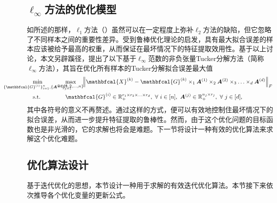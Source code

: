 \subsection{$\ell_{\infty}$方法的优化模型}\label{sec:linf}
如所述的那样，$\ell_{1}$方法（）虽然可以在一定程度上弥补$\ell_{2}$方法的缺陷，但它忽略了不同样本之间的重要性差异。受到鲁棒优化理论的启发，具有最大拟合误差的样本应该被给予最高的权重，从而保证在最坏情况下的特征提取效用性。基于以上讨论，本文另辟蹊径，提出了以下基于$\ell_\infty$范数的非负张量Tucker分解方法（简称$\ell_\infty$方法），其旨在优化所有样本的Tucker分解拟合误差最大值
\begin{equation}\label{eq:Linf}
\hspace{1em}
\begin{aligned}
    &\underset{\mathclap{\{\mathbfcal{G}^{(i)}\}_{i=1}^{n}, \{\boldsymbol{A}^{(j)}\}_{j=1}^{d}}}{\min} \qquad\quad &&\underset{\mathclap{k\in\{1,2,\ldots,n\}}}{\max}\quad \left\|\mathbfcal{X}^{(k)}-\mathbfcal{G}^{(k)} \times_{1} \boldsymbol{A}^{(1)} \times_{2} \boldsymbol{A}^{(2)}\times_{3} \ldots \times_{d} \boldsymbol{A}^{(d)}\right\|_{F}  \\
    &\text{s.t.} && \mathbfcal{G}^{(i)}\in\mathbb{R}_{+}^{r_1 \times r_2 \times \ldots \times r_d},~\forall~i\in[n] ,~\boldsymbol{A}^{(j)}\in \mathbb{R}_{+}^{n_j \times r_j},~\forall~j\in[d],
\end{aligned}
\end{equation}
其中各符号的意义不再赘述。通过这样的方式，便可以有效地控制住最坏情况下的拟合误差，从而进一步提升特征提取的鲁棒性。然而，由于这个优化问题的目标函数也是非光滑的，它的求解也将会是难题。下一节将设计一种有效的优化算法来求解这个优化难题。

\subsection{优化算法设计}\label{sec:linf-algodesign}
基于迭代优化的思想，本节设计一种用于求解的有效迭代优化算法。本节接下来依次推导各个优化变量的更新公式。

